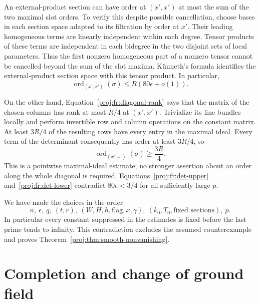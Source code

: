 \documentclass[11pt,letterpaper]{article}
\theoremstyle{definition}
\theoremstyle{remark}
\begin{document}
An external-product section can have order at \((x',x')\) at most
the sum of the two maximal slot orders. To verify this despite
possible cancellation, choose bases in each section space adapted to
its filtration by order at \(x'\). Their leading homogeneous terms
are linearly independent within each degree. Tensor products of
these terms are independent in each bidegree in the two disjoint
sets of local parameters. Thus the first nonzero homogeneous part
of a nonzero tensor cannot be cancelled beyond the sum of the slot
maxima. K\"unneth's formula identifies the external-product section
space with this tensor product. In particular,
\begin{equation}
\label{proj:fr:det-upper}
 \operatorname{ord}_{(x',x')}(\sigma)\leq R(80\epsilon+o(1)).
\end{equation}

On the other hand, Equation~\eqref{proj:fr:diagonal-rank} says that the
matrix of the chosen columns has rank at most \(R/4\) at \((x',x')\).
Trivialize its line bundles locally and perform invertible row and
column operations on the constant matrix. At least \(3R/4\) of the
resulting rows have every entry in the maximal ideal. Every term
of the determinant consequently has order at least \(3R/4\), so
\begin{equation}
\label{proj:fr:det-lower}
 \operatorname{ord}_{(x',x')}(\sigma)\geq\frac{3R}{4}.
\end{equation}
This is a pointwise maximal-ideal estimate; no stronger assertion
about an order along the whole diagonal is required.
Equations~\eqref{proj:fr:det-upper} and~\eqref{proj:fr:det-lower} contradict
\(80\epsilon<3/4\) for all sufficiently large \(p\).

We have made the choices in the order
\[
 n,\ \epsilon,\ q,\ (t,r),\
 (W,H,h,\text{flag},x,\gamma),\
 (k_0,T_0,\text{fixed sections}),\ p.
\]
In particular every constant suppressed in the estimates is fixed
before the last prime tends to infinity. This contradiction excludes
the assumed counterexample and proves
Theorem~\ref{proj:thm:smooth-nonvanishing}.

\section{Completion and change of ground field}\label{proj:sec:completion}
\end{document}
